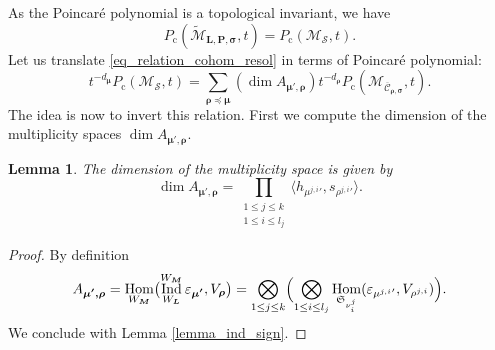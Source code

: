 \documentclass[JEP,XML,SOM,NoEqCountersInSection,Unicode,published]{cedram}
\newcommand{\rc}{\mathrm{c}}
\newcommand{\blangle}{\bigl\langle}
\newcommand{\brangle}{\bigr\rangle}
\let\epsilon\varepsilon
\theoremstyle{definition}
\theoremstyle{plain}
\newtheorem{lemma}[definition]{Lemma}
\DeclareMathOperator{\Hom}{Hom}
\DeclareMathOperator{\Ind}{Ind}
\newcommand{\Sym}{\mathfrak{S}}
\newcommand{\mlps}{\widetilde{\mathcal{M}}_{\boldsymbol{L},\boldsymbol{P},\boldsymbol{\sigma}}}
\begin{document}
As the Poincaré polynomial is a topological invariant, we have
\[
P_{\rc}(\mlps,t) = P_{\rc}(\mathcal{M}_{\boldsymbol{\mathcal{S}}},t).
\]
Let us translate \eqref{eq_relation_cohom_resol} in terms of Poincaré polynomial:
\begin{equation}\label{eq_combi_ss_resol}
t^{-d_{\boldsymbol{\mu}}} P_{\rc}\left(\mathcal{M}_{\boldsymbol{\mathcal{S}}},t\right) = \sum_{\boldsymbol{\rho\preceq\mu}}(\dim A_{\boldsymbol{\mu',\rho}}) t^{-d_{\boldsymbol{\rho}}} P_{\rc}(\mathcal{M}_{\overline{\mathcal{C}}_{\boldsymbol{\rho},\boldsymbol{\sigma}}}, t).
\end{equation}
The idea is now to invert this relation. First we compute the dimension of the multiplicity spaces $\dim A_{\boldsymbol{\mu',\rho}}$.
\begin{lemma}\label{lemma_dim_Amurho}
The dimension of the multiplicity space is given by
\[
\dim A_{\boldsymbol{\mu',\rho}} = \prod_{\substack{ 1\le j \le k \\ 1 \le i \le l_j }}\blangle h_{{\mu^{j,i}}'}, s_{ {\rho^{j,i}}' }\brangle.
\]
\end{lemma}
\begin{proof}
By definition
\[
A_{\boldsymbol{\mu',\rho}} = \Hom_{W_{\boldsymbol{M}}}
\bigl(\Ind_{W_{\boldsymbol{L}}}^{W_{\boldsymbol{M}}} \epsilon_{\boldsymbol{\mu'}}, V_{\boldsymbol{\rho}}\bigr)= \bigotimes_{1 \le j \le k} \Bigl(\bigotimes_{1 \le i \le l_j}\Hom_{\Sym_{\nu^j_i}}(\epsilon_{{\mu^{ j,i }}' },V_{\rho^{ j,i }}) \Bigr).
\]
We conclude with Lemma \ref{lemma_ind_sign}.
\end{proof}
\end{document}
